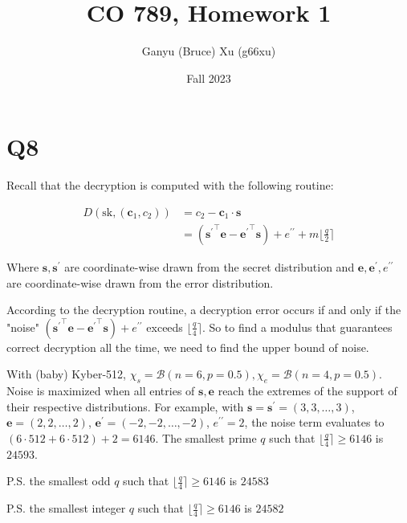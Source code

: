 \documentclass{article}
\title{CO 789, Homework 1}
\author{Ganyu (Bruce) Xu (g66xu)}
\date{Fall 2023}
\newcommand{\round}[1]{\lfloor {#1} \rceil}
\begin{document}

\section*{Q8}
Recall that the decryption is computed with the following routine:

$$
\begin{aligned}
D(\text{sk}, (\mathbf{c}_1, c_2))
&= c_2 - \mathbf{c}_1 \cdot \mathbf{s} \\
&= ({\mathbf{s}^\prime}^\intercal\mathbf{e} - {\mathbf{e}^\prime}^\intercal\mathbf{s}) + e^{\prime\prime} + m\round{\frac{q}{2}}
\end{aligned}
$$

Where $\mathbf{s}, \mathbf{s}^\prime$ are coordinate-wise drawn from the secret distribution and $\mathbf{e}, \mathbf{e}^\prime, e^{\prime\prime}$ are coordinate-wise drawn from the error distribution.

According to the decryption routine, a decryption error occurs if and only if the "noise" $({\mathbf{s}^\prime}^\intercal\mathbf{e} - {\mathbf{e}^\prime}^\intercal\mathbf{s}) + e^{\prime\prime}$ exceeds $\round{\frac{q}{4}}$. So to find a modulus that guarantees correct decryption all the time, we need to find the upper bound of noise.

With (baby) Kyber-512, $\chi_s = \mathcal{B}(n=6, p=0.5), \chi_e = \mathcal{B}(n=4, p=0.5)$. Noise is maximized when all entries of $\mathbf{s}, \mathbf{e}$ reach the extremes of the support of their respective distributions. For example, with $\mathbf{s} = \mathbf{s}^\prime = (3, 3, \ldots, 3)$, $\mathbf{e} = (2, 2, \ldots, 2)$, $\mathbf{e}^\prime = (-2, -2, \ldots, -2)$, $e^{\prime\prime} = 2$, the noise term evaluates to $(6 \cdot 512 + 6 \cdot 512) + 2 = 6146$. The smallest prime $q$ such that $\round{\frac{q}{4}} \geq 6146$ is $24593$.

P.S. the smallest odd $q$ such that $\round{\frac{q}{4}} \geq 6146$ is $24583$

P.S. the smallest integer $q$ such that $\round{\frac{q}{4}} \geq 6146$ is $24582$
\end{document}

